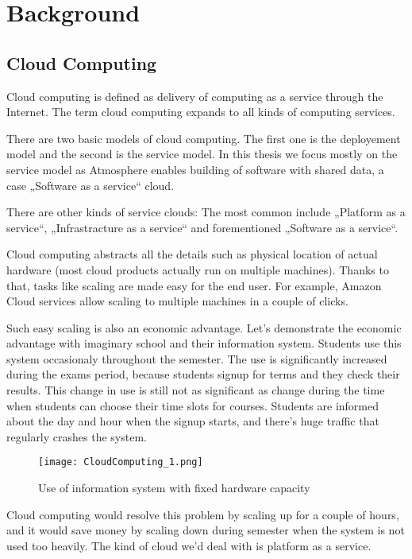 \section{Background}

\subsection{Cloud Computing}

Cloud computing is defined as delivery of computing as a service through the Internet. The term cloud computing expands to all kinds of computing services.

There are two basic models of cloud computing. The first one is the deployement model and the second is the service model. In this thesis we focus mostly on the service model as Atmosphere enables building of software with shared data, a case „Software as a service“ cloud. 

There are other kinds of service clouds: The most common include „Platform as a service“, „Infrastracture as a service“ and forementioned „Software as a service“.

Cloud computing abstracts all the details such as physical location of actual hardware (most cloud products actually run on multiple machines). Thanks to that, tasks like scaling are made easy for the end user. For example, Amazon Cloud services allow scaling to multiple machines in a couple of clicks.

Such easy scaling is also an economic advantage. Let’s demonstrate the economic advantage with imaginary school and their information system. Students use this system occasionaly throughout the semester. The use is significantly increased during the exams period, because students signup for terms and they check their results. This change in use is still not as significant as change during the time when students can choose their time slots for courses. Students are informed about the day and hour when the signup starts, and there’s huge traffic that regularly crashes the system.

\begin{figure}[ht!]
\centering
\texttt{[image: CloudComputing\_1.png]}
\caption{Use of information system with fixed hardware capacity \label{fig:1}}
\end{figure}

Cloud computing would resolve this problem by scaling up for a couple of hours, and it would save money by scaling down during semester when the system is not used too heavily. The kind of cloud we’d deal with is platform as a service.

